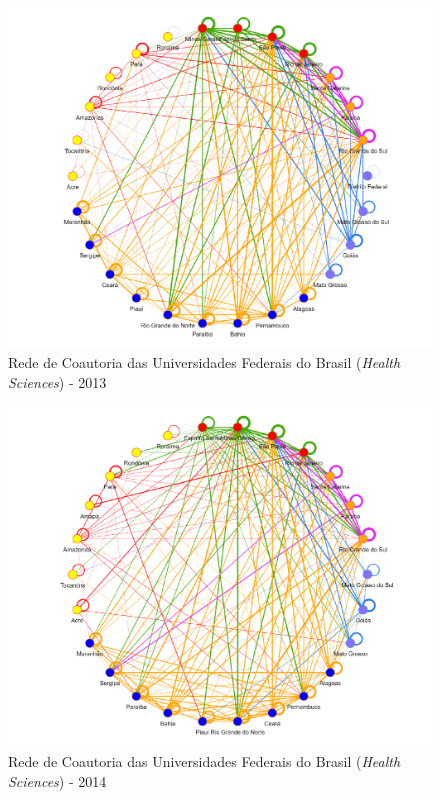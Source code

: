 \begin{figure}[H]
	\centering
	\includegraphics[width=\linewidth]{Imagens/rede-2013.pdf}
	\caption{Rede de Coautoria das Universidades Federais do Brasil (\textit{Health Sciences}) - 2013}
	\label{Rede de Coautoria - UF BR 2013}
\end{figure}

\begin{figure}[H]
	\centering
	\includegraphics[width=\linewidth]{Imagens/rede-2014.pdf}
	\caption{Rede de Coautoria das Universidades Federais do Brasil (\textit{Health Sciences}) - 2014}
	\label{Rede de Coautoria - UF BR 2014}
\end{figure}


